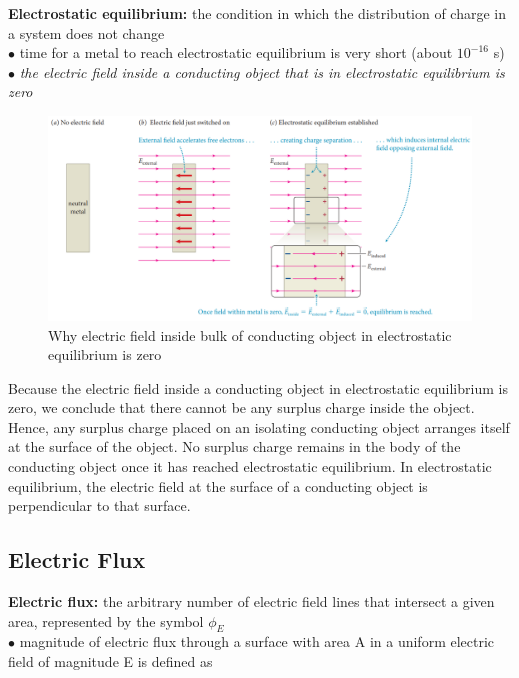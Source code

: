         \textbf{Electrostatic equilibrium:} the condition in which the distribution of charge in a system does not change \\
        $\bullet$ time for a metal to reach electrostatic equilibrium is very short (about $10^{-16}$ s) \\
        $\bullet$ \textit{the electric field inside a conducting object that is in electrostatic equilibrium is zero} \\

        \begin{figure}[hbt!]
            \centering
            \caption*{Why electric field inside bulk of conducting object in electrostatic equilibrium is zero}
            \includegraphics[scale = 0.6]{Resources/24.5_Electrostatic_Equilbrium}
        \end{figure}

        Because the electric field inside a conducting object in electrostatic equilibrium is zero, we conclude that there cannot be any surplus charge inside the object. Hence, any surplus charge placed on an
        isolating conducting object arranges itself at the surface of the object. No surplus charge remains in the body of the conducting object once it has reached electrostatic equilibrium. In electrostatic equilibrium,
        the electric field at the surface of a conducting object is perpendicular to that surface.

    \subsection{Electric Flux}  %

        \textbf{Electric flux:} the arbitrary number of electric field lines that intersect a given area, represented by the symbol $\phi_E$ \\
        $\bullet$ magnitude of electric flux through a surface with area A in a uniform electric field of magnitude E is defined as \\


